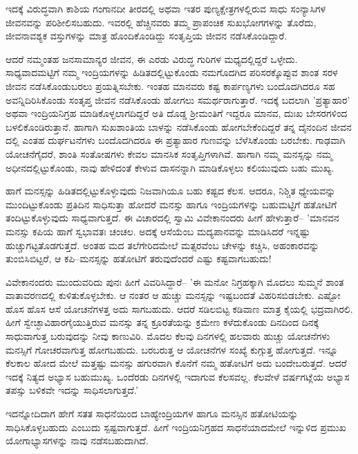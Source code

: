 ಇದಕ್ಕೆ ವಿರುದ್ಧವಾಗಿ ಕಾಶಿಯ ಗಂಗಾನದೀ ತೀರದಲ್ಲಿ ಅಥವಾ ಇತರ ಪುಣ್ಯಕ್ಷೇತ್ರಗಳಲ್ಲಿರುವ ಸಾಧು ಸಂನ್ಯಾಸಿಗಳ ಜೀವನವನ್ನು ಪರಿಶೀಲಿಸಬಹುದು. ಇವರಲ್ಲಿ ಹೆಚ್ಚಿನವರು ತಮ್ಮ ಪ್ರಾಪಂಚಿಕ ಸುಖಭೋಗಗಳನ್ನು ತೊರೆದು, ಜೀವನಾವಶ್ಯಕ ವಸ್ತುಗಳನ್ನು ಮಾತ್ರ ಹೊಂದಿಕೊಂಡಿದ್ದು ಸಂತೃಪ್ತಿಯ ಜೀವನ ನಡೆಸಿಕೊಂಡಿದ್ದಾರೆ.

ಆದರೆ ನಮ್ಮಂತಹ ಜನಸಾಮಾನ್ಯರ ಜೀವನ, ಈ ಎರಡು ವಿರುದ್ಧ ಗುರಿಗಳ  ಮಧ್ಯದಲ್ಲಿದ್ದರೆ ಒಳ್ಳೇದು. ಸಾಧ್ಯವಾದಮಟ್ಟಿಗೆ ನಮ್ಮ ಇಂದ್ರಿಯಗಳನ್ನು ಹಿಡಿತದಲ್ಲಿಟ್ಟುಕೊಂಡು ನಮಗೊದಗಿದ ಪರಿಸರಕ್ಕೊಪ್ಪುವ ಶಾಂತ ಸರಳ ಜೀವನ ನಡೆಸಿಕೊಂಡುಬರಲು ಪ್ರಯತ್ನಿಸಬೇಕು. ಇಂತಹ ಮಾನವರು ಕಷ್ಟ ಕಾರ್ಪಣ್ಯಗಳು ಬಂದೊದಗಿದರೂ ಸಹ ಅವನ್ನಿದಿರಿಸಿಕೊಂಡು ಸಂತೃಪ್ತ ಜೀವನ ನಡೆಸಿಕೊಂಡು ಹೋಗಲು ಸಮರ್ಥರಾಗುತ್ತಾರೆ. ಇದಕ್ಕೆ ಬದಲಾಗಿ 'ಪ್ರತ್ಯಾಹಾರ' ಅಥವಾ ಇಂದ್ರಿಯನಿಗ್ರಹ ಮಾಡಿಕೊಳ್ಳಲಾಗದಿದ್ದರೆ ಅತಿ ದೊಡ್ಡ ಶ‍್ರೀಮಂತಿಗೆ ಇದ್ದರೂ ಮಾನವ, ದುಃಖ ಬೇಸರಗಳಿಂದ ಬಳಲಿಕೊಂಡಿರುತ್ತಾನೆ. ಹಾಗಾಗಿ ಸುಖಶಾಂತಿಯ ಬಾಳನ್ನು ನಡೆಸಿಕೊಂಡು ಹೋಗಬೇಕೆಂದಿದ್ದರೆ ತನ್ನ ದೈನಂದಿನ ಜೀವನ ದಲ್ಲಿ ಎಂತಹ ದುರ್ಘಟನೆಗಳು ಬಂದೊದಗಿದರೂ ಈ ಪ್ರತ್ಯಾಹಾರ ಗುಣವನ್ನು ಬೆಳೆಸಿಕೊಂಡು ಬರಬೇಕು. ಗಾಢವಾಗಿ ಯೋಚನೆಗೈದರೆ, ಶಾಂತಿ ಸಂತೋಷಗಳು ಕೇವಲ ಮಾನಸಿಕ ಸಂತೃಪ್ತಿಗಳಾಗಿವೆ. ಹಾಗಾಗಿ ನಮ್ಮ ಮನಸ್ಸನ್ನು ನಮ್ಮ ಅಧೀನದಲ್ಲಿಟ್ಟುಕೊಂಡು, ನಾವು ಹೇಳಿದಂತೆ ಕೇಳುವ ದಾಸನನ್ನಾಗಿ ಮಾಡಿಕೊಳ್ಳಲು ಕಲಿಯುವುದು ಬಹು ಮುಖ್ಯ.

ಹಾಗೆ ಮನಸ್ಸನ್ನು ಹಿಡಿತದಲ್ಲಿಟ್ಟುಕೊಳ್ಳುವುದು ನಿಜವಾಗಿಯೂ ಬಹು ಕಷ್ಟದ ಕೆಲಸ. ಆದರೂ, ನಿಶ್ಚಿತ ಧ್ಯೇಯವನ್ನು ಮುಂದಿಟ್ಟುಕೊಂಡು ಪ್ರತಿದಿನ ಸಾಧಿಸುತ್ತಾ ಹೋದರೆ ಮನಸ್ಸು ಹಾಗೂ ಇಂದ್ರಿಯಗಳನ್ನು ಬಹುಮಟ್ಟಿಗೆ ಹತೋಟಿಗೆ ತಂದಿಟ್ಟುಕೊಳ್ಳುವುದು ಸಾಧ್ಯವಾಗುತ್ತದೆ. ಈ ವಿಚಾರದಲ್ಲಿ ಸ್ವಾಮಿ ವಿವೇಕಾನಂದರು ಹೀಗೆ ಹೇಳುತ್ತಾರೆ– 'ಮಾನವನ ಮನಸ್ಸು ಕಪಿಯ ಹಾಗೆ ಸ್ವಭಾವತಃ ಚಂಚಲ. ಅದಕ್ಕೆ ಆಸೆಯೆಂಬ ಮದ್ಯಪಾನವನ್ನು ಮಾಡಿಸಿದರೆ ಇನ್ನಷ್ಟು ಹುಚ್ಚುಗಟ್ಟತೊಡಗುತ್ತದೆ. ಅಂತಹ ಮದ ತಲೆಗೇರಿದಮೇಲೆ ಮತ್ಸರವೆಂಬ ಚೇಳನ್ನು ಕಚ್ಚಿಸಿ, ಅಹಂಕಾರವನ್ನು ತುಂಬಿಸಿಬಿಟ್ಟರೆ, ಆ ಕಪಿ–ಮನಸ್ಸನ್ನು ಹತೋಟಿಗೆ ತರುವುದೆಂದರೆ ಎಷ್ಟು ಕಷ್ಟವಾಗಬಹುದು!

ವಿವೇಕಾನಂದರು ಮುಂದುವರಿದು ಪುನಃ ಹೀಗೆ ವಿವರಿಸಿದ್ದಾರೆ– 'ಈ ಮನೋ ನಿಗ್ರಹಕ್ಕಾಗಿ ಮೊದಲು ಸುಮ್ಮನೆ ಶಾಂತ ವಾತಾವರಣದಲ್ಲಿ ಕುಳಿತುಕೊಳ್ಳಬೇಕು. ಆ ನಂತರ ಆ ಹುಚ್ಚು ಮನಸ್ಸನ್ನು ಇಷ್ಟಬಂದತೆ ವಿಹರಿಸಬಿಡಬೇಕು. ಎಷ್ಟೋ ಹೊಸ ಹೊಸ ಆಸೆ ಯೋಚನೆಗಳತ್ತ ಅದು ಸಾಗಬಹುದು. ಆದರೆ ಸಡಿಲಬಿಟ್ಟ ಕಡಿವಾಣ ಮಾತ್ರ ಕೈಯಲ್ಲಿ ಭದ್ರವಾಗಿರಲಿ. ಹೀಗೆ ಸ್ವೇಚ್ಛಾವಿಹಾರಗೈಯುತ್ತಿರುವ ಮನಸ್ಸು ತನ್ನ ಕ್ರೂರತೆಯನ್ನು ಕ್ರಮೇಣ ಕಳೆದುಕೊಂಡು ದಿನದಿಂದ ದಿನಕ್ಕೆ ಸಾಧುವಾಗುತ್ತ ಬರುವುದನ್ನು ನೀವು ಕಾಣುವಿರಿ. ಮೊದಲ ಕೆಲವು ದಿನಗಳಲ್ಲಿ ಹಲವಾರು ಹುಚ್ಚು ಯೋಚನೆಗಳು ಮನಸ್ಸಿಗೆ ಗೋಚರವಾಗುತ್ತ ಹೋಗಬಹುದು. ಬರಬರುತ್ತ ಆ ಯೋಚನೆಗಳ ಸಂಖ್ಯೆ ಕುಗ್ಗುತ್ತ ಹೋಗುತ್ತದೆ. ಇನ್ನೂ ಕೆಲಕಾಲ ಹೋದ ಮೇಲೆ ಮತ್ತಷ್ಟು ಮನಸ್ಸು ಹಗುರವಾಗಿ ಕೊನೆಗೆ ನಮ್ಮ ಹತೋಟಿಗೆ ಅದು ಬಂದೇಬರುತ್ತದೆ. ಆದರೆ ಇದಕ್ಕೆ ನಿತ್ಯದ ಅಭ್ಯಾಸ ಬಹುಮುಖ್ಯ. ಒಂದೆರಡು ದಿನಗಳಲ್ಲಿ ಇದಾಗುವ ಕೆಲಸವಲ್ಲ. ಕೆಲವೇಳೆ ವರ್ಷಗಟ್ಲೆಯ ಅಭ್ಯಾಸ ತಪಸ್ಸು ಬಳಿಕವೇ ಇದನ್ನು ಸಾಧಿಸಲಾಗುತ್ತದೆ.'

ಇದನ್ನೋದಿದಾಗ ಹೇಗೆ ಸತತ ಸಾಧನೆಯಿಂದ ಬಾಹ್ಯೇಂದ್ರಿಯಗಳ ಹಾಗೂ ಮನಸ್ಸಿನ ಹತೋಟಿಯನ್ನು ಸಾಧಿಸಿಕೊಳ್ಳಬಹುದು ಎಂಬುದು ಸ್ಪಷ್ಟವಾಗುತ್ತದೆ. ಹೀಗೆ ಇಂದ್ರಿಯನಿಗ್ರಹದ ಸಾಧನೆಯಾದಮೇಲೆ ಇನ್ನುಳಿದ ಪ್ರಮುಖ ಯೋಗಾಭ್ಯಾಸಗಳನ್ನು ನಾವು ನಡೆಸಬಹುದಾಗಿದೆ.

